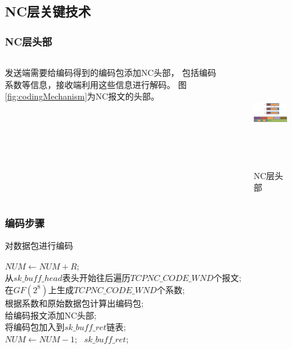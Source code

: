 \subsection{NC层关键技术}
\begin{frame}
	\frametitle{NC层头部}
	\begin{columns}
		\begin{column}{0.4\textwidth}
			发送端需要给编码得到的编码包添加NC头部，
			包括编码系数等信息，接收端利用这些信息进行解码。
			图\ref{fig:codingMechanism}为NC报文的头部。
		\end{column}
		\begin{column}{0.6\textwidth}
			\begin{figure}
				\includegraphics[height=4cm]{../figures/codingheader.eps}
				\label{fig:codingheader}
				\caption{NC层头部}
			\end{figure}
		\end{column}
	\end{columns}
\end{frame}
\begin{frame}
	\frametitle{编码步骤}
	\renewcommand{\algorithmcfname}{算法}
	\begin{algorithm}
		\caption{对数据包进行编码} 
		\label{algo:bianma}
		$NUM \leftarrow NUM+R$;\\
		{  
			从$sk\_buff\_head$表头开始往后遍历$TCPNC\_CODE\_WND$个报文;\\
			在$GF\left(2^8\right)$上生成$TCPNC\_CODE\_WND$个系数;\\
			根据系数和原始数据包计算出编码包;\\
			给编码报文添加NC头部;\\
			将编码包加入到$sk\_buff\_ret$链表;\\
			$NUM \leftarrow NUM-1$;
		}
		\Return \ $sk\_buff\_ret$;
	\end{algorithm}
\end{frame}


